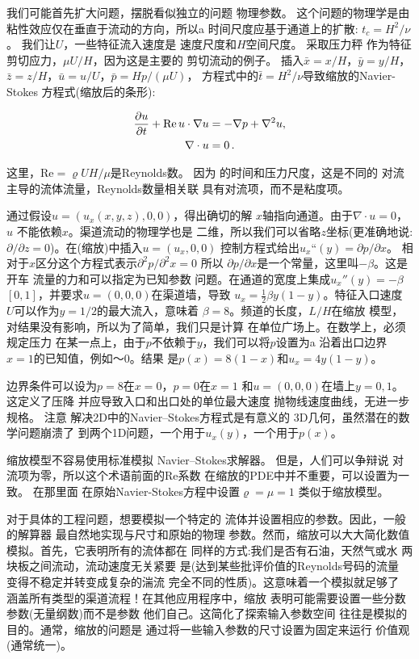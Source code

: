 
我们可能首先扩大问题，摆脱看似独立的问题
物理参数。 这个问题的物理学是由
粘性效应仅在垂直于流动的方向，所以a
时间尺度应基于通道上的扩散: $t_c =
H^2/\nu$。 我们让$U$，一些特征流入速度是
速度尺度和$H$空间尺度。 采取压力秤
作为特征剪切应力，$\mu U/H$，因为这是主要的
剪切流动的例子。 插入$\bar x = x/H$，$\bar y = y/H$，
$\bar z = z/H$，$\bar u = u/U$，$\bar p = Hp/(\mu U)$，
方程式中的$\bar t = H^2/\nu$导致缩放的Navier-Stokes
方程式(缩放后的条形):


\begin{align*}
\frac{\partial u}{\partial t} + \mathrm{Re}\, u\cdot\nabla u
&= -\nabla p + \nabla^2 u,\\
\nabla\cdot u &= 0\thinspace .
\end{align*}

这里，$\mathrm{Re} = \varrho UH/\mu$是Reynolds数。 因为
的时间和压力尺度，这是不同的
对流主导的流体流量，Reynolds数量相关联
具有对流项，而不是粘度项。

通过假设$u=(u_x(x,y,z),0,0)$，得出确切的解
$x$轴指向通道。由于$\nabla\cdot u=0$，$u$
不能依赖$x$。渠道流动的物理学也是
二维，所以我们可以省略$z$坐标(更准确地说:
$\partial/\partial z=0$)。在(缩放)中插入$u=(u_x,0,0)$
控制方程式给出$u_x“(y) = \partial p/\partial x$。
相对于$x$区分这个方程式表示$\partial^2
p/\partial^2 x =0$ 所以 $\partial
p/\partial x$是一个常量，这里叫$-\beta$。这是开车
流量的力和可以指定为已知参数
问题。在通道的宽度上集成$u_x''(y)=-\beta$
$[0,1]$，并要求$u=(0, 0, 0)$在渠道墙，导致
$u_x=\frac{1}{2}\beta y(1-y)$。特征入口速度
$U$可以作为$y=1/2$的最大流入，意味着
$\beta = 8$。频道的长度，$L/H$在缩放
模型，对结果没有影响，所以为了简单，我们只是计算
在单位广场上。在数学上，必须规定压力
在某一点上，由于$p$不依赖于$y$，我们可以将$p$设置为a
沿着出口边界$x=1$的已知值，例如〜0。结果
是$p(x)=8(1-x)$和$u_x=4y(1-y)$。

边界条件可以设为$p=8$在$x=0$，$p=0$在$x=1$
和$u=(0, 0, 0)$在墙上$y=0,1$。 这定义了压降
并应导致入口和出口处的单位最大速度
抛物线速度曲线，无进一步规格。 注意
解决2D中的Navier--Stokes方程式是有意义的
3D几何，虽然潜在的数学问题崩溃了
到两个1D问题，一个用于$u_x(y)$，一个用于$p(x)$。

缩放模型不容易使用标准模拟
Navier--Stokes求解器。 但是，人们可以争辩说
对流项为零，所以这个术语前面的Re系数
在缩放的PDE中并不重要，可以设置为一致。 在那里面
在原始Navier-Stokes方程中设置$\varrho = \mu = 1$
类似于缩放模型。

对于具体的工程问题，想要模拟一个特定的
流体并设置相应的参数。因此，一般的解算器
最自然地实现与尺寸和原始的物理
参数。然而，缩放可以大大简化数值
模拟。首先，它表明所有的流体都在
同样的方式:我们是否有石油，天然气或水
两块板之间流动，流动速度无关紧要
是(达到某些批评价值的Reynolds号码的流量
变得不稳定并转变成复杂的湍流
完全不同的性质)。这意味着一个模拟就足够了
涵盖所有类型的渠道流程！在其他应用程序中，缩放
表明可能需要设置一些分数
参数(无量纲数)而不是参数
他们自己。这简化了探索输入参数空间
往往是模拟的目的。通常，缩放的问题是
通过将一些输入参数的尺寸设置为固定来运行
价值观(通常统一)。

